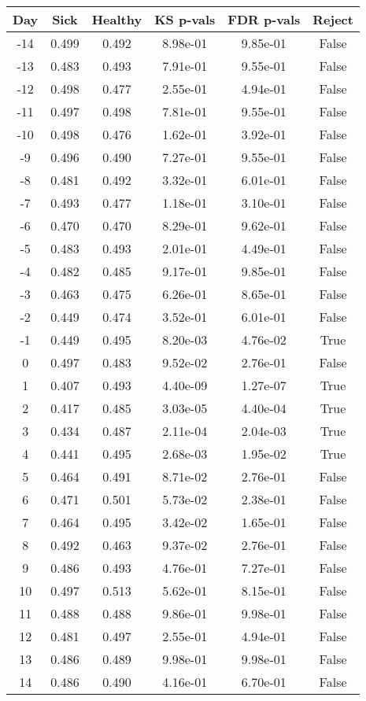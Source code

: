 \begin{tabular}{c|c|c|c|c|c}
Day &  Sick & Healthy &  KS p-vals & FDR p-vals & Reject\\
\hline
-14 & 0.499 &   0.492 &   8.98e-01 &   9.85e-01 &  False\\
-13 & 0.483 &   0.493 &   7.91e-01 &   9.55e-01 &  False\\
-12 & 0.498 &   0.477 &   2.55e-01 &   4.94e-01 &  False\\
-11 & 0.497 &   0.498 &   7.81e-01 &   9.55e-01 &  False\\
-10 & 0.498 &   0.476 &   1.62e-01 &   3.92e-01 &  False\\
 -9 & 0.496 &   0.490 &   7.27e-01 &   9.55e-01 &  False\\
 -8 & 0.481 &   0.492 &   3.32e-01 &   6.01e-01 &  False\\
 -7 & 0.493 &   0.477 &   1.18e-01 &   3.10e-01 &  False\\
 -6 & 0.470 &   0.470 &   8.29e-01 &   9.62e-01 &  False\\
 -5 & 0.483 &   0.493 &   2.01e-01 &   4.49e-01 &  False\\
 -4 & 0.482 &   0.485 &   9.17e-01 &   9.85e-01 &  False\\
 -3 & 0.463 &   0.475 &   6.26e-01 &   8.65e-01 &  False\\
 -2 & 0.449 &   0.474 &   3.52e-01 &   6.01e-01 &  False\\
 -1 & 0.449 &   0.495 &   8.20e-03 &   4.76e-02 &   True\\
  0 & 0.497 &   0.483 &   9.52e-02 &   2.76e-01 &  False\\
  1 & 0.407 &   0.493 &   4.40e-09 &   1.27e-07 &   True\\
  2 & 0.417 &   0.485 &   3.03e-05 &   4.40e-04 &   True\\
  3 & 0.434 &   0.487 &   2.11e-04 &   2.04e-03 &   True\\
  4 & 0.441 &   0.495 &   2.68e-03 &   1.95e-02 &   True\\
  5 & 0.464 &   0.491 &   8.71e-02 &   2.76e-01 &  False\\
  6 & 0.471 &   0.501 &   5.73e-02 &   2.38e-01 &  False\\
  7 & 0.464 &   0.495 &   3.42e-02 &   1.65e-01 &  False\\
  8 & 0.492 &   0.463 &   9.37e-02 &   2.76e-01 &  False\\
  9 & 0.486 &   0.493 &   4.76e-01 &   7.27e-01 &  False\\
 10 & 0.497 &   0.513 &   5.62e-01 &   8.15e-01 &  False\\
 11 & 0.488 &   0.488 &   9.86e-01 &   9.98e-01 &  False\\
 12 & 0.481 &   0.497 &   2.55e-01 &   4.94e-01 &  False\\
 13 & 0.486 &   0.489 &   9.98e-01 &   9.98e-01 &  False\\
 14 & 0.486 &   0.490 &   4.16e-01 &   6.70e-01 &  False\\
\end{tabular}